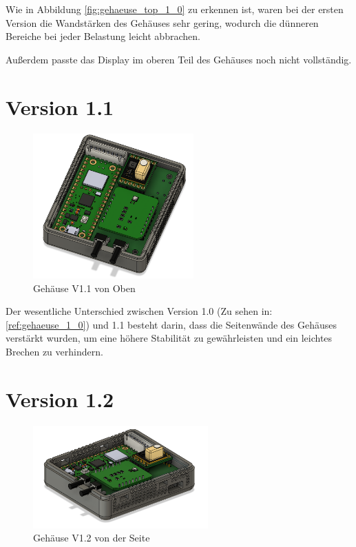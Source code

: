 \begin{inhalt}
Wie in Abbildung \ref{fig:gehaeuse_top_1_0} zu erkennen ist, waren bei der ersten Version die Wandstärken des Gehäuses sehr gering, wodurch die dünneren Bereiche bei jeder Belastung leicht abbrachen.



\vspace{0.15cm}

Außerdem passte das Display im oberen Teil des Gehäuses noch nicht vollständig.

\newpage

\section{Version 1.1}

\begin{figure}[!htb]
\centering
\includegraphics[width=0.55\textwidth]{files/Thomas/pics/geheause/1.1/gehaeuse_top.png}
\caption[Bildbezeichnung für Abbildungsverzeichnis]{Gehäuse V1.1 von Oben}
\label{fig:gehaeuse_internet_bild}
\end{figure}

Der wesentliche Unterschied zwischen Version 1.0 (Zu sehen in: \ref{ref:gehaeuse_1_0}) und 1.1 besteht darin, dass die Seitenwände des Gehäuses verstärkt wurden, um eine höhere Stabilität zu gewährleisten und ein leichtes Brechen zu verhindern.

\newpage

\section{Version 1.2}

\begin{figure}[!htb]
\centering
\includegraphics[width=0.6\textwidth]{files/Thomas/pics/geheause/1.2/gehaeuse_side.png}
\caption[Bildbezeichnung für Abbildungsverzeichnis]{Gehäuse V1.2 von der Seite}
\label{fig:gehaeuse_internet_bild}
\end{figure}


\end{inhalt}
